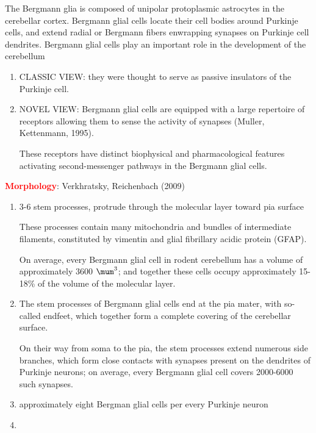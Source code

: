 The Bergmann glia is composed of unipolar protoplasmic astrocytes in the
cerebellar cortex. Bergmann glial cells locate their cell bodies around Purkinje
cells, and extend radial or Bergmann fibers enwrapping synapses on Purkinje cell
dendrites.  Bergmann glial cells play an important role in the development of
the cerebellum 

\begin{enumerate}
  \item CLASSIC VIEW:  they were thought to serve as passive insulators of the Purkinje
cell.
  
  \item NOVEL VIEW: Bergmann glial cells are equipped with a large repertoire of
  receptors allowing them to sense the activity of synapses (Muller,
  Kettenmann, 1995).
  
  These receptors have distinct biophysical and pharmacological features
  activating second-messenger pathways in the Bergmann glial cells. 
  
\end{enumerate}


\textcolor{red}{\bf Morphology}: Verkhratsky, Reichenbach (2009)
\begin{enumerate}
  \item 3-6 stem processes, protrude through the molecular layer toward pia
  surface
  
  These processes contain many mitochondria and bundles of intermediate
filaments, constituted by vimentin and glial fibrillary acidic protein (GFAP).

On average, every Bergmann glial cell in rodent cerebellum has a volume of
approximately 3600 $\mum^3$; and together these cells occupy approximately
15-18\% of the volume of the molecular layer.

  \item The stem processes of Bergmann glial cells end at the pia mater, with
  so-called endfeet, which together form a complete covering of the cerebellar
  surface.

On their way from soma to the pia, the stem processes extend numerous side
branches, which form close contacts with synapses present on the dendrites of
Purkinje neurons; on average, every Bergmann glial cell covers 2000-6000 such
synapses.

  \item approximately eight Bergman glial cells per every Purkinje neuron

  \item 
\end{enumerate}

